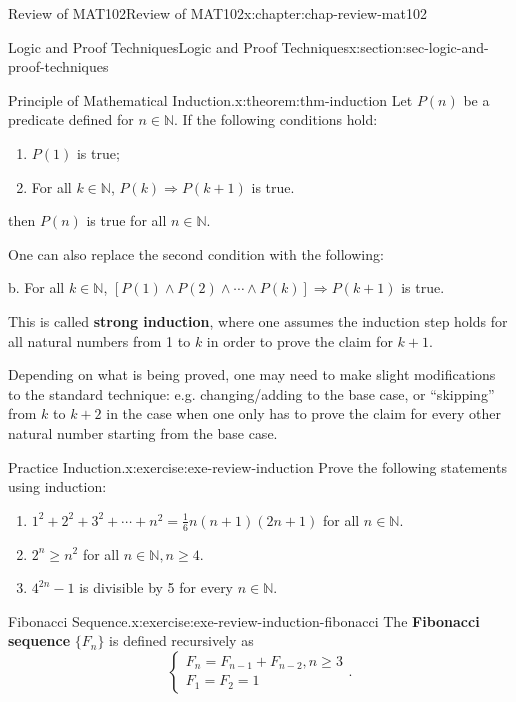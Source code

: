 \documentclass[oneside,10pt,]{book}
\newcommand{\terminology}[1]{\textbf{#1}}
\numberwithin{equation}{section}
\begin{document}
\begin{chapterptx}{Review of MAT102}{}{Review of MAT102}{}{}{x:chapter:chap-review-mat102}
\begin{sectionptx}{Logic and Proof Techniques}{}{Logic and Proof Techniques}{}{}{x:section:sec-logic-and-proof-techniques}
\begin{theorem}{Principle of Mathematical Induction.}{}{x:theorem:thm-induction}%
Let \(P(n)\) be a predicate defined for \(n \in \mathbb{N}\). If the following conditions hold:%
\begin{enumerate}[label=(\alph*)]
\item{}\(P(1)\) is true;%
\item{}For all \(k \in \mathbb{N}\), \(P(k) \Rightarrow P(k+1)\) is true.%
\end{enumerate}
then \(P(n)\) is true for all \(n \in \mathbb{N}\).%
\par
One can also replace the second condition with the following:%
\par
b.\textasteriskcentered{} For all \(k \in \mathbb{N}\), \([P(1) \wedge P(2) \wedge \cdots \wedge P(k)] \Rightarrow P(k+1)\) is true.%
\par
This is called \terminology{strong induction}, where one assumes the induction step holds for all natural numbers from 1 to \(k\) in order to prove the claim for \(k+1\).%
\end{theorem}
Depending on what is being proved, one may need to make slight modifications to the standard technique: e.g. changing\slash{}adding to the base case, or ``skipping'' from \(k\) to \(k+2\) in the case when one only has to prove the claim for every other natural number starting from the base case.%
\begin{inlineexercise}{Practice Induction.}{x:exercise:exe-review-induction}%
Prove the following statements using induction:%
%
\begin{enumerate}[label=(\alph*)]
\item{}\(1^2 + 2^2 + 3^2 + \cdots + n^2 = \frac{1}{6}n(n+1)(2n+1)\) for all \(n \in \mathbb{N}\).%
\item{}\(2^n \geq n^2\) for all \(n \in \mathbb{N}, n \geq 4\).%
\item{}\(4^{2n} -1\) is divisible by 5 for every \(n \in \mathbb{N}\).%
\end{enumerate}
\end{inlineexercise}
\begin{inlineexercise}{Fibonacci Sequence.}{x:exercise:exe-review-induction-fibonacci}%
The \terminology{Fibonacci sequence} \(\{F_n\}\) is defined recursively as%
\begin{equation*}
\begin{cases} F_n = F_{n-1} + F_{n-2}, n \geq 3 \\
F_1 = F_2 = 1 \end{cases}\text{.}

\end{equation*}
\end{inlineexercise}
\end{sectionptx}
\end{chapterptx}
\end{document}
